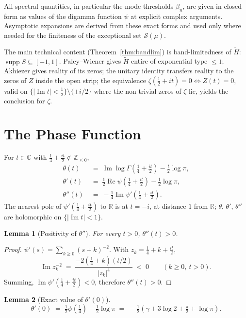 \documentclass[11pt]{article}
\newtheorem{lemma}{Lemma}
\DeclareMathOperator{\ImOp}{Im}
\DeclareMathOperator{\ReOp}{Re}
\let\Im\ImOp
\let\Re\ReOp
\DeclareMathOperator{\supp}{supp}
\begin{document}
All spectral quantities, in particular the mode thresholds $\beta_n$, are given in closed form as values of the digamma function $\psi$ at explicit complex arguments. Asymptotic expansions are derived from these exact forms and used only where needed for the finiteness of the exceptional set $\mathcal{S}(\mu)$.

The main technical content (Theorem~\ref{thm:bandlim}) is band-limitedness of $\tilde H$: $\supp S\subseteq[-1,1]$. Paley--Wiener gives $\tilde H$ entire of exponential type $\le 1$; Akhiezer gives reality of its zeros; the unitary identity transfers reality to the zeros of $Z$ inside the open strip; the equivalence $\zeta(\tfrac{1}{2}+it)=0\iff Z(t)=0$, valid on $\{|\Im t|<\tfrac{1}{2}\}\setminus\{\pm i/2\}$ where the non-trivial zeros of $\zeta$ lie, yields the conclusion for $\zeta$.

\section{The Phase Function}

For $t\in\mathbb{C}$ with $\tfrac{1}{4}+\tfrac{it}{2}\notin\mathbb{Z}_{\le 0}$,
\begin{align}
\theta(t) &\;=\; \Im\log\Gamma\!\left(\tfrac{1}{4}+\tfrac{it}{2}\right) - \tfrac{t}{2}\log\pi, \label{eq:theta}\\
\theta'(t) &\;=\; \tfrac{1}{2}\Re\psi\!\left(\tfrac{1}{4}+\tfrac{it}{2}\right) - \tfrac{1}{2}\log\pi, \label{eq:thetap}\\
\theta''(t) &\;=\; -\tfrac{1}{4}\Im\psi'\!\left(\tfrac{1}{4}+\tfrac{it}{2}\right). \label{eq:thetapp}
\end{align}
The nearest pole of $\psi'(\tfrac{1}{4}+\tfrac{it}{2})$ to $\mathbb{R}$ is at $t=-i$, at distance $1$ from $\mathbb{R}$; $\theta$, $\theta'$, $\theta''$ are holomorphic on $\{|\Im t|<1\}$.

\begin{lemma}[Positivity of $\theta''$]\label{lem:thetapp}
For every $t>0$, $\theta''(t)>0$.
\end{lemma}

\begin{proof}
$\psi'(s)=\sum_{k\ge 0}(s+k)^{-2}$. With $z_k=\tfrac{1}{4}+k+\tfrac{it}{2}$,
\[
\Im z_k^{-2} \;=\; \frac{-2(\tfrac{1}{4}+k)(t/2)}{|z_k|^4} \;<\; 0 \qquad (k\ge 0,\ t>0).
\]
Summing, $\Im\psi'(\tfrac{1}{4}+\tfrac{it}{2})<0$, therefore $\theta''(t)>0$.
\end{proof}

\begin{lemma}[Exact value of $\theta'(0)$]\label{lem:thetaprime0}
\[
\theta'(0) \;=\; \tfrac{1}{2}\psi(\tfrac{1}{4}) - \tfrac{1}{2}\log\pi \;=\; -\tfrac{1}{2}\!\left(\gamma + 3\log 2 + \tfrac{\pi}{2} + \log\pi\right).
\]
\end{lemma}
\end{document}
